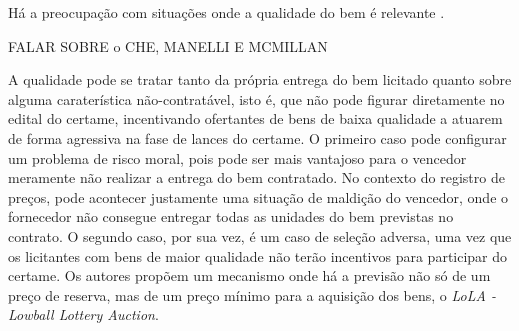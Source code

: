 Há a preocupação com situações onde a qualidade do bem é relevante \citet{villa:2022}.

{\huge FALAR SOBRE o CHE, MANELLI E MCMILLAN}

A qualidade pode se tratar tanto da própria entrega do bem licitado quanto sobre alguma caraterística não-contratável, isto é, que não pode figurar diretamente no edital do certame, incentivando ofertantes de bens de baixa qualidade a atuarem de forma agressiva na fase de lances do certame. O primeiro caso pode configurar um problema de risco moral, pois pode ser mais vantajoso para o vencedor meramente não realizar a entrega do bem contratado. No contexto do registro de preços, pode acontecer justamente uma situação de maldição do vencedor, onde o fornecedor não consegue entregar todas as unidades do bem previstas no contrato. O segundo caso, por sua vez, é um caso de seleção adversa, uma vez que os licitantes com bens de maior qualidade não terão incentivos para participar do certame. Os autores propõem um mecanismo onde há a previsão não só de um preço de reserva, mas de um preço mínimo para a aquisição dos bens, o \emph{LoLA - Lowball Lottery Auction}.
